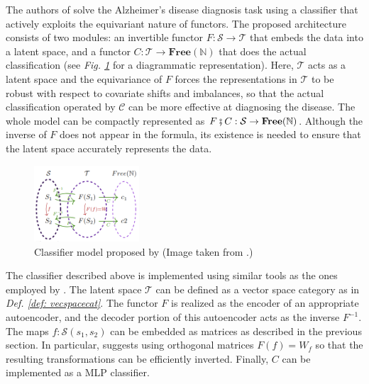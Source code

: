 \documentclass[11pt,a4paper,openright,twoside]{report}
\theoremstyle{plain}
\theoremstyle{definition}
\begin{document}
The authors of \cite{chytas2024poolingimagedatasetsmultiple} solve the Alzheimer's disease diagnosis task using a classifier that actively exploits the equivariant nature of functors. The proposed architecture consists of two modules: an invertible functor $F: \mathcal{S} \to \mathcal{T}$ that embeds the data into a latent space, and a functor $C: \mathcal{T} \to \mathbf{Free}(\mathbb{N})$ that does the actual classification (see \textit{Fig. \ref{fig: classifier}} for a diagrammatic representation). Here, $\mathcal{T}$ acts as a latent space and the equivariance of $F$ forces the representations in $\mathcal{T}$ to be robust with respect to covariate shifts and imbalances, so that the actual classification operated by $\mathcal{C}$ can be more effective at diagnosing the disease. The whole model can be compactly represented as $F \fatsemi C: \mathcal{S} \to \mathbf{Free}(\mathbb{N})$. Although the inverse of $F$ does not appear in the formula, its existence is needed to ensure that the latent space accurately represents the data.

\begin{figure}[h]
  \begin{center}
    \includegraphics[width=0.35\textwidth]{figures/classifier.png}     
    \caption[Classifier]{Classifier model proposed by \cite{chytas2024poolingimagedatasetsmultiple} (Image taken from \cite{chytas2024poolingimagedatasetsmultiple}.)}
    \label{fig: classifier}
  \end{center}
\end{figure}

The classifier described above is implemented using similar tools as the ones employed by \cite{sheshmani2021categorical}. The latent space $\mathcal{T}$ can be defined as a vector space category as in \textit{Def. \ref{def: vecspacecat}}. The functor $F$ is realized as the encoder of an appropriate autoencoder, and the decoder portion of this autoencoder acts as the inverse $F^{-1}$. The maps $f: \mathcal{S}(s_1,s_2)$ can be embedded as matrices as described in the previous section. In particular, \cite{chytas2024poolingimagedatasetsmultiple}  suggests using orthogonal matrices $F(f) = W_f$ so that the resulting transformations can be efficiently inverted.
Finally, $C$ can be implemented as a MLP classifier.
\end{document}
